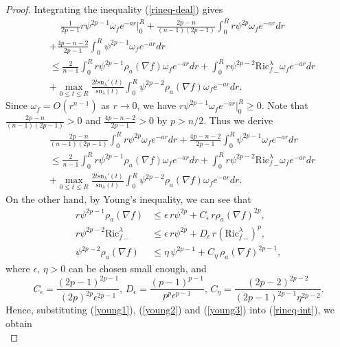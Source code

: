 \documentclass[11pt]{amsart}
\numberwithin{equation}{section}
\newcommand{\sn}{\mathrm{sn}}
\begin{document}
\begin{proof}
	Integrating the inequality (\ref{rineq-deal}) gives
	\begin{align*}
		&\quad\,\frac{1}{2p-1}r\psi^{2p-1}\omega_fe^{-ar}\bigg|_0^R+\frac{2p-n}{(n-1)(2p-1)}\int_{0}^{R}r\psi^{2p}\omega_fe^{-ar}dr\\
		&+\frac{4p-n-2}{2p-1}\int_0^R\psi^{2p-1}\omega_fe^{-ar}dr\\
		&\leq \frac{2}{n-1}\int_{0}^Rr\psi^{2p-1}\rho_a(\nabla f)\omega_fe^{-ar}dr+\int_{0}^Rr\psi^{2p-2}{\mathrm{Ric}^\lambda_f}_-\omega_fe^{-ar}dr\\
		&+\max_{0\leq t\leq R}\frac{2t\sn_\lambda'(t)}{\sn_\lambda(t)}\int_{0}^R\psi^{2p-2}\rho_a(\nabla f)\omega_fe^{-ar}dr.
	\end{align*}
	Since $\omega_f=O(r^{n-1})$ as $r\to 0$, we have
	$r\psi^{2p-1}\omega_fe^{-ar}\big|_0^R\geq 0$.  Note that
	$\frac{2p-n}{(n-1)(2p-1)}>0$ and $\frac{4p-n-2}{2p-1}>0$ by $p>n/2$.  Thus  we derive
	\begin{equation}
		\begin{aligned}
			&\frac{2p-n}{(n-1)(2p-1)}\int_{0}^{R}r\psi^{2p}\omega_fe^{-ar}dr+\frac{4p-n-2}{2p-1}\int_0^R\psi^{2p-1}\omega_fe^{-ar}dr\\
			&\leq \frac{2}{n-1}\int_{0}^Rr\psi^{2p-1}\rho_a(\nabla f)\omega_fe^{-ar}dr+\int_{0}^Rr\psi^{2p-2}{\mathrm{Ric}^\lambda_f}_-\omega_fe^{-ar}dr\\
			&+\max_{0\leq t\leq R}\frac{2t\sn_\lambda'(t)}{\sn_\lambda(t)}\int_{0}^R\psi^{2p-2}\rho_a(\nabla f)\omega_fe^{-ar}dr.
		\end{aligned}
		\label{rineq-int}
	\end{equation}
	On the other hand, by Young's inequality, we can see that
	\begin{align}
		r\psi^{2p-1}\rho_a(\nabla f)&\leq \epsilon\,r \psi^{2p}+C_\epsilon\,r\rho_a(\nabla f)^{2p} ,\label{young1}\\
		r\psi^{2p-2}{\mathrm{Ric}_f^\lambda}_-&\leq \epsilon\,
		r\psi^{2p}+D_\epsilon\,r({\mathrm{Ric}_f^\lambda}_-)^p ,\label{young2}\\
		\psi^{2p-2}\rho_a(\nabla f) &\leq \eta\, \psi^{2p-1}+C_\eta\,\rho_a(\nabla f)^{2p-1},\label{young3}
	\end{align}
	where $\epsilon,\,\eta >0$ can be chosen small enough, and
	\[
	C_\epsilon=\frac{(2p-1)^{2p-1}}{(2p)^{2p}\epsilon^{2p-1}},\, D_\epsilon=\frac{(p-1)^{p-1}}{p^p\epsilon^{p-1}},\, C_\eta=\frac{(2p-2)^{2p-2}}{(2p-1)^{2p-1}\eta^{2p-2}}.
	\]
	Hence, substituting (\ref{young1}), (\ref{young2}) and (\ref{young3}) into (\ref{rineq-int}), we obtain
	\begin{equation*}

\end{equation*}
\end{proof}
\end{document}
